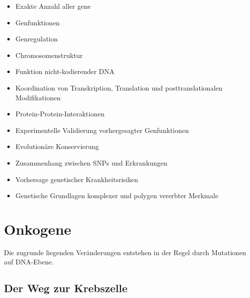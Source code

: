 \begin{itemize}

    \item Exakte Anzahl aller \gls{gen}e

    \item Genfunktionen

    \item Genregulation

    \item Chromosomenstruktur

    \item Funktion nicht-kodierender DNA

    \item Koordination von
    Transkription,
    Translation
    und posttranslationalen Modifikationen

    \item Protein-Protein-Interaktionen

    \item Experimentelle Validierung
    vorhergesagter Genfunktionen

    \item Evolutionäre Konservierung

    \item Zusammenhang zwischen SNPs
    und Erkrankungen

    \item Vorhersage genetischer
    Krankheitsrisiken

    \item Genetische Grundlagen
    komplexer und polygen vererbter Merkmale

\end{itemize}



\section{Onkogene}\label{sec:onkogene}
Die zugrunde liegenden Veränderungen entstehen in der Regel
durch Mutationen auf DNA-Ebene.


\subsection*{Der Weg zur Krebszelle}\label{subsec:der-weg-zur-krebszelle}

